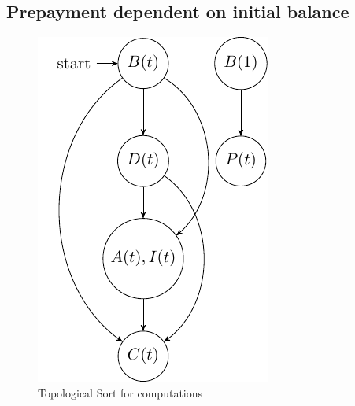 \documentclass[12pt]{book}
\begin{document}
\subsection{Prepayment dependent on initial balance}
\begin{figure}[H]
  \centering
      \includegraphics[width=.3\textwidth]{Graph1.pdf} 
 \caption{Topological Sort for computations}
 \label{fig:Test}
\end{figure}
\end{document}
